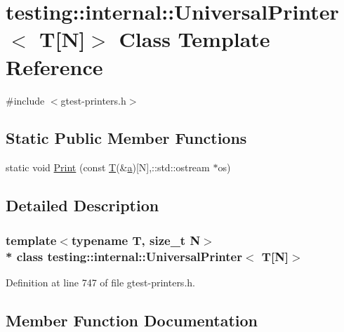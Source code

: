 \hypertarget{classtesting_1_1internal_1_1_universal_printer_3_01_t[_n]_4}{}\section{testing\+:\+:internal\+:\+:Universal\+Printer$<$ T\mbox{[}N\mbox{]}$>$ Class Template Reference}
\label{classtesting_1_1internal_1_1_universal_printer_3_01_t[_n]_4}


{\ttfamily \#include $<$gtest-\/printers.\+h$>$}

\subsection*{Static Public Member Functions}
\begin{DoxyCompactItemize}
\item 
static void \hyperlink{classtesting_1_1internal_1_1_universal_printer_3_01_t[_n]_4_a47e8cb5abce40735db381910513a4721}{Print} (const \hyperlink{functions__7_8js_adf1f3edb9115acb0a1e04209b7a9937b}{T}(\&\hyperlink{_07copy_08_2_read_camera_model_8m_a551a3d351eadcc0b9b1a2f24f0fb5ea0}{a})\mbox{[}N\mbox{]},\+::std\+::ostream $\ast$os)
\end{DoxyCompactItemize}


\subsection{Detailed Description}
\subsubsection*{template$<$typename T, size\+\_\+t N$>$\\*
class testing\+::internal\+::\+Universal\+Printer$<$ T\mbox{[}\+N\mbox{]}$>$}



Definition at line 747 of file gtest-\/printers.\+h.



\subsection{Member Function Documentation}
